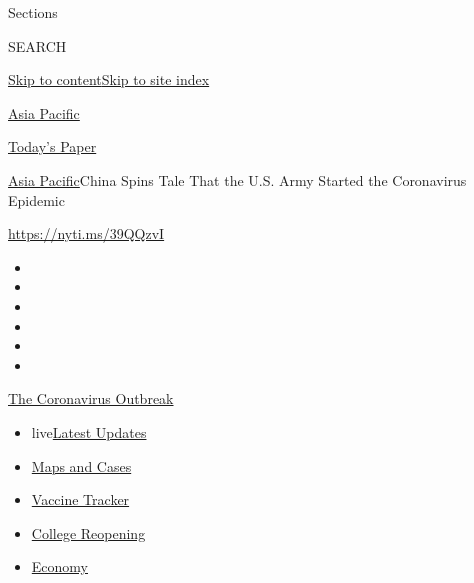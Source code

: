 Sections

SEARCH

\protect\hyperlink{site-content}{Skip to
content}\protect\hyperlink{site-index}{Skip to site index}

\href{https://www.nytimes3xbfgragh.onion/section/world/asia}{Asia
Pacific}

\href{https://myaccount.nytimes3xbfgragh.onion/auth/login?response_type=cookie\&client_id=vi}{}

\href{https://www.nytimes3xbfgragh.onion/section/todayspaper}{Today's
Paper}

\href{/section/world/asia}{Asia Pacific}\textbar{}China Spins Tale That
the U.S. Army Started the Coronavirus Epidemic

\href{https://nyti.ms/39QQzvI}{https://nyti.ms/39QQzvI}

\begin{itemize}
\item
\item
\item
\item
\item
\item
\end{itemize}

\href{https://www.nytimes3xbfgragh.onion/news-event/coronavirus?action=click\&pgtype=Article\&state=default\&region=TOP_BANNER\&context=storylines_menu}{The
Coronavirus Outbreak}

\begin{itemize}
\tightlist
\item
  live\href{https://www.nytimes3xbfgragh.onion/2020/08/04/world/coronavirus-covid-19.html?action=click\&pgtype=Article\&state=default\&region=TOP_BANNER\&context=storylines_menu}{Latest
  Updates}
\item
  \href{https://www.nytimes3xbfgragh.onion/interactive/2020/us/coronavirus-us-cases.html?action=click\&pgtype=Article\&state=default\&region=TOP_BANNER\&context=storylines_menu}{Maps
  and Cases}
\item
  \href{https://www.nytimes3xbfgragh.onion/interactive/2020/science/coronavirus-vaccine-tracker.html?action=click\&pgtype=Article\&state=default\&region=TOP_BANNER\&context=storylines_menu}{Vaccine
  Tracker}
\item
  \href{https://www.nytimes3xbfgragh.onion/2020/08/02/us/covid-college-reopening.html?action=click\&pgtype=Article\&state=default\&region=TOP_BANNER\&context=storylines_menu}{College
  Reopening}
\item
  \href{https://www.nytimes3xbfgragh.onion/live/2020/08/03/business/stock-market-today-coronavirus?action=click\&pgtype=Article\&state=default\&region=TOP_BANNER\&context=storylines_menu}{Economy}
\end{itemize}

